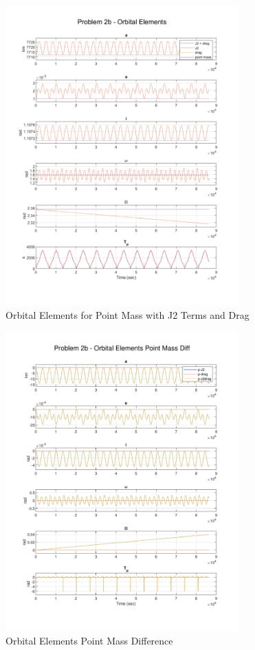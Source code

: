 \documentclass[conf]{new-aiaa}
\begin{document}
\begin{figure}[H]
	\centering
	\includegraphics[width=0.8\textwidth]{Problem 2b - Orbital Elements.pdf}
	\caption{Orbital Elements for Point Mass with J2 Terms and Drag} 
\end{figure}

\begin{figure}[H]
	\centering 
	\includegraphics[width=0.8\textwidth]{Problem 2b - Orbital Elements Point Mass Diff.pdf}
	\caption{Orbital Elements Point Mass Difference} 
\end{figure}
\end{document}
